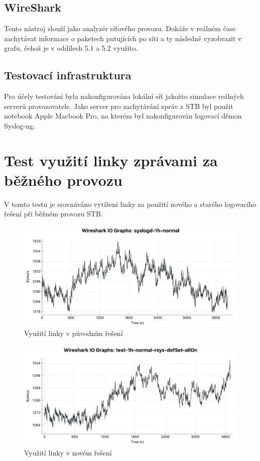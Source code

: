 \documentclass[thesis=B,czech]{FITthesis}[2012/06/26]
\begin{document}
\subsection{WireShark}
Tento nástroj slouží jako analyzér síťového provozu. Dokáže v reálném čase zachytávat informace o paketech putujících po síti a ty následně vyzobrazit v grafu, čehož je v oddílech 5.1 a 5.2 využito.

\subsection{Testovací infrastruktura}
Pro účely testování byla nakonfigurována lokální síť jakožto simulace reálných serverů provozovatele. Jako server pro zachytávání zpráv z STB byl použit notebook Apple Macbook Pro, na kterém byl nakonfigurován logovací démon Syslog-ng.

\section{Test využití linky zprávami za běžného provozu}
 V tomto testu je srovnáváno vytížení linky za použití nového a starého logovacího řešení při běžném provozu STB. 

\begin{figure}[H]
	\centering
	\includegraphics[scale=0.44]{images/test-1h-syslogd-default}
	\caption[Využití linky v původním řešení]{Využití linky v původním řešení}
\end{figure}

\begin{figure}[H]
	\centering
	\includegraphics[scale=0.44]{images/test-1h-rsys-default}
	\caption[Využití linky v novém řešení]{Využití linky v novém řešení}
\end{figure}
\end{document}
